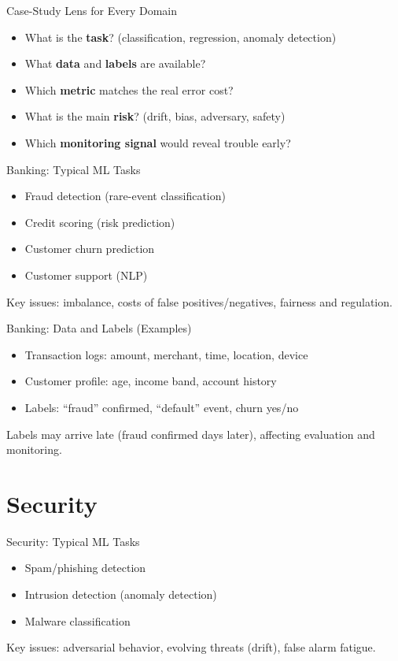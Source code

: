 \documentclass[aspectratio=169]{beamer}
\begin{document}
\begin{frame}{Case-Study Lens for Every Domain}
  \begin{itemize}[<+->]
    \item What is the \textbf{task}? (classification, regression, anomaly detection)
    \item What \textbf{data} and \textbf{labels} are available?
    \item Which \textbf{metric} matches the real error cost?
    \item What is the main \textbf{risk}? (drift, bias, adversary, safety)
    \item Which \textbf{monitoring signal} would reveal trouble early?
  \end{itemize}
\end{frame}

\begin{frame}{Banking: Typical ML Tasks}
  \begin{itemize}[<+->]
    \item Fraud detection (rare-event classification)
    \item Credit scoring (risk prediction)
    \item Customer churn prediction
    \item Customer support (NLP)
  \end{itemize}
  \vspace{0.4em}
  Key issues: imbalance, costs of false positives/negatives, fairness and regulation.
\end{frame}

\begin{frame}{Banking: Data and Labels (Examples)}
  \begin{itemize}[<+->]
    \item Transaction logs: amount, merchant, time, location, device
    \item Customer profile: age, income band, account history
    \item Labels: ``fraud'' confirmed, ``default'' event, churn yes/no
  \end{itemize}
  \small Labels may arrive late (fraud confirmed days later), affecting evaluation and monitoring.
\end{frame}

\section{Security}
\label{sec:sec}

\begin{frame}{Security: Typical ML Tasks}
  \begin{itemize}[<+->]
    \item Spam/phishing detection
    \item Intrusion detection (anomaly detection)
    \item Malware classification
  \end{itemize}
  \vspace{0.4em}
  Key issues: adversarial behavior, evolving threats (drift), false alarm fatigue.
\end{frame}
\end{document}
